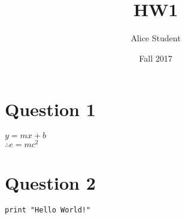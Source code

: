 \documentclass{neu_handout}
\title{HW1}
\author{Alice Student}
\date{Fall 2017}
\begin{document}
\section*{Question 1}

$y=mx+b$ \\
$\therefore e=mc^2$ \\

\section*{Question 2}

\begin{verbatim}
print "Hello World!"
\end{verbatim}
\end{document}
